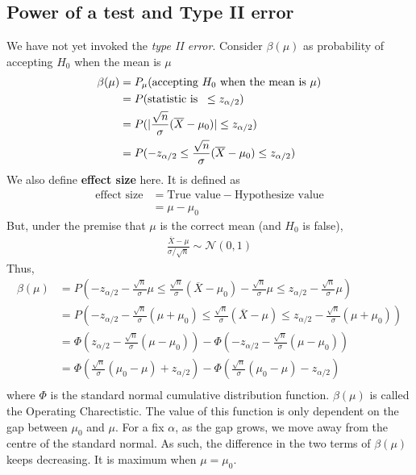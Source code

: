 \documentclass[../probability-notes.tex]{subfiles}
\begin{document}
    \subsection{Power of a test and Type II error}\label{power_of_test}
    We have not yet invoked the \emph{type II error}. Consider $\beta(\mu)$ as probability of accepting $H_{0}$ when the mean is $\mu$
    \begin{align*}
        \beta(\mu) &= P_{\mu}(\text{accepting $H_{0}$ when the mean is $\mu$})\\
        &= P(\text{statistic is \:} \leq z_{\alpha/2})\\
        &= P(|\frac{\sqrt{n}}{\sigma}(\overline{X} - \mu_{0})| \leq z_{\alpha/2})\\
        &= P(-z_{\alpha/2} \leq \frac{\sqrt{n}}{\sigma}(\overline{X} - \mu_{0}) \leq z_{\alpha/2})
    \end{align*}
    We also define \textbf{effect size} here. It is defined as
    \begin{align*}
        \text{effect size} &= \text{True value} - \text{Hypothesize value}\\
        &= \mu - \mu_{0}
    \end{align*}
    But, under the premise that $\mu$ is the correct mean (and $H_{0}$ is false),
    \begin{align*}
        \frac{\overline{X} - \mu}{\sigma/\sqrt{n}} \sim \mathcal{N}(0, 1)
    \end{align*}
    Thus,
    \begin{align*}
        \beta(\mu) &= P(-z_{\alpha/2} - \frac{\sqrt{n}}{\sigma}\mu \leq \frac{\sqrt{n}}{\sigma}(\overline{X} - \mu_{0}) - \frac{\sqrt{n}}{\sigma}\mu \leq z_{\alpha/2} - \frac{\sqrt{n}}{\sigma}\mu)\\
        &= P(-z_{\alpha/2} - \frac{\sqrt{n}}{\sigma}(\mu + \mu_{0}) \leq \frac{\sqrt{n}}{\sigma}(\overline{X} - \mu) \leq z_{\alpha/2} - \frac{\sqrt{n}}{\sigma}(\mu + \mu_{0}))\\
        &= \Phi(z_{\alpha/2} - \frac{\sqrt{n}}{\sigma}(\mu - \mu_{0})) - \Phi(-z_{\alpha/2} - \frac{\sqrt{n}}{\sigma}(\mu - \mu_{0}))\\
        &= \Phi(\frac{\sqrt{n}}{\sigma}(\mu_{0} - \mu) +z_{\alpha/2}) - \Phi(\frac{\sqrt{n}}{\sigma}(\mu_{0} - \mu) -z_{\alpha/2})\\
    \end{align*}
    where $\Phi$ is the standard normal cumulative distribution function.\newline
    $\beta(\mu)$ is called the Operating Charectistic. The value of this function is only dependent on the gap between $\mu_{0}$ and $\mu$. For a fix $\alpha$, as the gap grows, we move away from the centre of the standard normal. As such, the difference in the two terms of $\beta(\mu)$ keeps decreasing. It is maximum when $\mu = \mu_{0}$.
\end{document}
